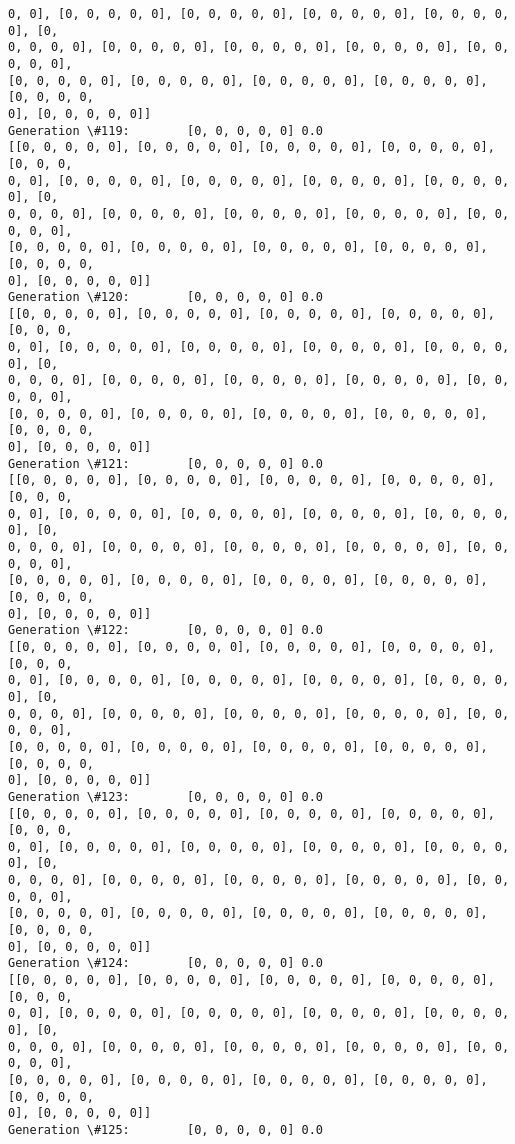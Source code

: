 \documentclass[11pt]{article}
\begin{document}
\begin{Verbatim}[commandchars=\\\{\}]
0, 0], [0, 0, 0, 0, 0], [0, 0, 0, 0, 0], [0, 0, 0, 0, 0], [0, 0, 0, 0, 0], [0,
0, 0, 0, 0], [0, 0, 0, 0, 0], [0, 0, 0, 0, 0], [0, 0, 0, 0, 0], [0, 0, 0, 0, 0],
[0, 0, 0, 0, 0], [0, 0, 0, 0, 0], [0, 0, 0, 0, 0], [0, 0, 0, 0, 0], [0, 0, 0, 0,
0], [0, 0, 0, 0, 0]]
Generation \#119:        [0, 0, 0, 0, 0] 0.0
[[0, 0, 0, 0, 0], [0, 0, 0, 0, 0], [0, 0, 0, 0, 0], [0, 0, 0, 0, 0], [0, 0, 0,
0, 0], [0, 0, 0, 0, 0], [0, 0, 0, 0, 0], [0, 0, 0, 0, 0], [0, 0, 0, 0, 0], [0,
0, 0, 0, 0], [0, 0, 0, 0, 0], [0, 0, 0, 0, 0], [0, 0, 0, 0, 0], [0, 0, 0, 0, 0],
[0, 0, 0, 0, 0], [0, 0, 0, 0, 0], [0, 0, 0, 0, 0], [0, 0, 0, 0, 0], [0, 0, 0, 0,
0], [0, 0, 0, 0, 0]]
Generation \#120:        [0, 0, 0, 0, 0] 0.0
[[0, 0, 0, 0, 0], [0, 0, 0, 0, 0], [0, 0, 0, 0, 0], [0, 0, 0, 0, 0], [0, 0, 0,
0, 0], [0, 0, 0, 0, 0], [0, 0, 0, 0, 0], [0, 0, 0, 0, 0], [0, 0, 0, 0, 0], [0,
0, 0, 0, 0], [0, 0, 0, 0, 0], [0, 0, 0, 0, 0], [0, 0, 0, 0, 0], [0, 0, 0, 0, 0],
[0, 0, 0, 0, 0], [0, 0, 0, 0, 0], [0, 0, 0, 0, 0], [0, 0, 0, 0, 0], [0, 0, 0, 0,
0], [0, 0, 0, 0, 0]]
Generation \#121:        [0, 0, 0, 0, 0] 0.0
[[0, 0, 0, 0, 0], [0, 0, 0, 0, 0], [0, 0, 0, 0, 0], [0, 0, 0, 0, 0], [0, 0, 0,
0, 0], [0, 0, 0, 0, 0], [0, 0, 0, 0, 0], [0, 0, 0, 0, 0], [0, 0, 0, 0, 0], [0,
0, 0, 0, 0], [0, 0, 0, 0, 0], [0, 0, 0, 0, 0], [0, 0, 0, 0, 0], [0, 0, 0, 0, 0],
[0, 0, 0, 0, 0], [0, 0, 0, 0, 0], [0, 0, 0, 0, 0], [0, 0, 0, 0, 0], [0, 0, 0, 0,
0], [0, 0, 0, 0, 0]]
Generation \#122:        [0, 0, 0, 0, 0] 0.0
[[0, 0, 0, 0, 0], [0, 0, 0, 0, 0], [0, 0, 0, 0, 0], [0, 0, 0, 0, 0], [0, 0, 0,
0, 0], [0, 0, 0, 0, 0], [0, 0, 0, 0, 0], [0, 0, 0, 0, 0], [0, 0, 0, 0, 0], [0,
0, 0, 0, 0], [0, 0, 0, 0, 0], [0, 0, 0, 0, 0], [0, 0, 0, 0, 0], [0, 0, 0, 0, 0],
[0, 0, 0, 0, 0], [0, 0, 0, 0, 0], [0, 0, 0, 0, 0], [0, 0, 0, 0, 0], [0, 0, 0, 0,
0], [0, 0, 0, 0, 0]]
Generation \#123:        [0, 0, 0, 0, 0] 0.0
[[0, 0, 0, 0, 0], [0, 0, 0, 0, 0], [0, 0, 0, 0, 0], [0, 0, 0, 0, 0], [0, 0, 0,
0, 0], [0, 0, 0, 0, 0], [0, 0, 0, 0, 0], [0, 0, 0, 0, 0], [0, 0, 0, 0, 0], [0,
0, 0, 0, 0], [0, 0, 0, 0, 0], [0, 0, 0, 0, 0], [0, 0, 0, 0, 0], [0, 0, 0, 0, 0],
[0, 0, 0, 0, 0], [0, 0, 0, 0, 0], [0, 0, 0, 0, 0], [0, 0, 0, 0, 0], [0, 0, 0, 0,
0], [0, 0, 0, 0, 0]]
Generation \#124:        [0, 0, 0, 0, 0] 0.0
[[0, 0, 0, 0, 0], [0, 0, 0, 0, 0], [0, 0, 0, 0, 0], [0, 0, 0, 0, 0], [0, 0, 0,
0, 0], [0, 0, 0, 0, 0], [0, 0, 0, 0, 0], [0, 0, 0, 0, 0], [0, 0, 0, 0, 0], [0,
0, 0, 0, 0], [0, 0, 0, 0, 0], [0, 0, 0, 0, 0], [0, 0, 0, 0, 0], [0, 0, 0, 0, 0],
[0, 0, 0, 0, 0], [0, 0, 0, 0, 0], [0, 0, 0, 0, 0], [0, 0, 0, 0, 0], [0, 0, 0, 0,
0], [0, 0, 0, 0, 0]]
Generation \#125:        [0, 0, 0, 0, 0] 0.0

\end{Verbatim}
\end{document}
